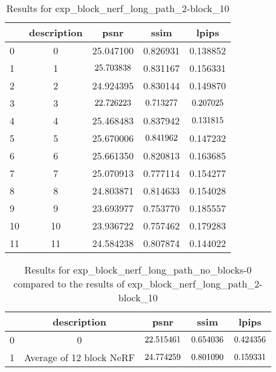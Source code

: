 \begin{table}
\centering
\caption{Results for exp\_block\_nerf\_long\_path\_2-block\_10}
\label{tab:exp_block_nerf_long_path_2-block_10}
\begin{tabular}{|l|c|c|c|c|}
\toprule
 & description & psnr & ssim & lpips \\
\midrule
0 & 0 & 25.047100 & 0.826931 & 0.138852 \\
\cline{1-5}
1 & 1 & $\cellcolor{green} 25.703838$ & 0.831167 & 0.156331 \\
\cline{1-5}
2 & 2 & 24.924395 & 0.830144 & 0.149870 \\
\cline{1-5}
3 & 3 & $\cellcolor{red} 22.726223$ & $\cellcolor{red} 0.713277$ & $\cellcolor{red} 0.207025$ \\
\cline{1-5}
4 & 4 & 25.468483 & 0.837942 & $\cellcolor{green} 0.131815$ \\
\cline{1-5}
5 & 5 & 25.670006 & $\cellcolor{green} 0.841962$ & 0.147232 \\
\cline{1-5}
6 & 6 & 25.661350 & 0.820813 & 0.163685 \\
\cline{1-5}
7 & 7 & 25.070913 & 0.777114 & 0.154277 \\
\cline{1-5}
8 & 8 & 24.803871 & 0.814633 & 0.154028 \\
\cline{1-5}
9 & 9 & 23.693977 & 0.753770 & 0.185557 \\
\cline{1-5}
10 & 10 & 23.936722 & 0.757462 & 0.179283 \\
\cline{1-5}
11 & 11 & 24.584238 & 0.807874 & 0.144022 \\
\cline{1-5}
\bottomrule
\end{tabular}
\end{table}


\begin{table}
\centering
\caption{Results for exp\_block\_nerf\_long\_path\_no\_blocks-0 compared to the results of exp\_block\_nerf\_long\_path\_2-block\_10}
\label{tab:exp_block_nerf_long_path_no_blocks-0}
\begin{tabular}{|l|c|c|c|c|}
\toprule
  & description & psnr & ssim & lpips \\
\midrule
0 & 0 & $\cellcolor{red} 22.515461$ & $\cellcolor{red} 0.654036$ & $\cellcolor{red} 0.424356$ \\
\cline{1-5}
1 & Average of 12 block NeRF & $\cellcolor{green} 24.774259$ & $\cellcolor{green} 0.801090$ & $\cellcolor{green} 0.159331$ \\
\cline{1-5}
\bottomrule
\end{tabular}
\end{table}



